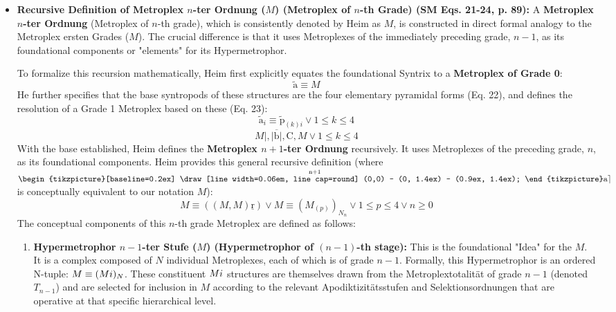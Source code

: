\documentclass[12pt]{article}
\newcommand{\korporatorkette}{\mathord{\text{%
  \begin{tikzpicture}[baseline=0.2ex]
    \draw[line width=0.06em, line cap=round] 
         (0,0) -- (0, 1.4ex) -- (0.9ex, 1.4ex);
  \end{tikzpicture}%
}}}
\def\metroplex#1#2{M}%
\newcommand{\hypersyntrix}{\metroplex{1}{F}}
\newcommand{\hypermetrophor}[1]{%
  \metroplex{#1}{a}%
}
\newcommand{\metroplextotalitaet}[1]{T_{#1}}
\begin{document}
\begin{itemize}
    \item \textbf{Recursive Definition of Metroplex \( n \)-ter Ordnung (\( \metroplex{n}{} \)) (Metroplex of \(n\)-th Grade) (SM Eqs. 21-24, p. 89):}
    A \textbf{Metroplex \( n \)-ter Ordnung} (Metroplex of \( n \)-th grade), which is consistently denoted by Heim as \( \metroplex{n}{} \), is constructed in direct formal analogy to the Metroplex ersten Grades (\( \hypersyntrix \)). The crucial difference is that it uses Metroplexes of the immediately preceding grade, \( n-1 \), as its foundational components or "elements" for its Hypermetrophor. 
    
    To formalize this recursion mathematically, Heim first explicitly equates the foundational Syntrix to a \textbf{Metroplex of Grade 0}:
    \begin{equation}
    \tilde{\mathrm{a}} \equiv \metroplex{0}{a} \tag{21}
    \end{equation}
    He further specifies that the base syntropods of these structures are the four elementary pyramidal forms (Eq. 22), and defines the resolution of a Grade 1 Metroplex based on these (Eq. 23):
    \begin{equation}
    \tilde{\mathrm{a}}_i \equiv \tilde{\mathrm{p}}_{(k)i} \lor 1 \le k \le 4 \tag{22}
    \end{equation}
    \begin{equation}
    \metroplex{1}{a}|, \overline{|\mathrm{b}|}, \mathrm{C}, \metroplex{1}{p_{(k)}} \lor 1 \le k \le 4 \tag{23}
    \end{equation}
    With the base established, Heim defines the \textbf{Metroplex \( n+1 \)-ter Ordnung} recursively. It uses Metroplexes of the preceding grade, \( n \), as its foundational components. Heim provides this general recursive definition (where \( \overset{\mathrm{n+1}}{\korporatorkette\mathrm{a}\rceil} \) is conceptually equivalent to our notation \( \metroplex{n+1}{} \)):
    \begin{equation}
    \metroplex{n+1}{a} \equiv \left( ( \metroplex{n}{F}, \metroplex{\tilde{n}}{a} ) \underline{\mathrm{r}} \right) \lor \metroplex{\tilde{n}}{a} \equiv \left( \metroplex{n}{a_j}_{(p)} \right)_{N_n} \lor 1 \le p \le 4 \lor n \ge 0
    \label{eq:original_metroplex_n_formal}
    \tag{24}
    \end{equation}
    The conceptual components of this \(n\)-th grade Metroplex are defined as follows:
    \begin{enumerate}
        \item \textbf{Hypermetrophor \( n-1 \)-ter Stufe (\( \hypermetrophor{n-1}{} \)) (Hypermetrophor of \( (n-1) \)-th stage):} This is the foundational "Idea" for the \( \metroplex{n}{} \). It is a complex composed of \( N \) individual Metroplexes, each of which is of grade \( n-1 \). Formally, this Hypermetrophor is an ordered N-tuple: \( \hypermetrophor{n-1}{} \equiv (\metroplex{n-1}_i)_N \). These constituent \( \metroplex{n-1}_i \) structures are themselves drawn from the Metroplextotalität of grade \( n-1 \) (denoted \( \metroplextotalitaet{n-1} \)) and are selected for inclusion in \( \hypermetrophor{n-1}{} \) according to the relevant Apodiktizitätsstufen and Selektionsordnungen that are operative at that specific hierarchical level.

\end{enumerate}
\end{itemize}
\end{document}
